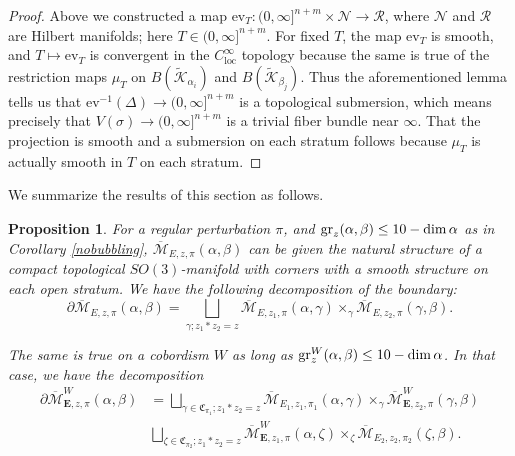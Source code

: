 \documentclass{memo-l}
\newtheorem{proposition}[theorem]{Proposition}
\theoremstyle{definition}
\theoremstyle{remark}
\numberwithin{section}{chapter}
\numberwithin{equation}{chapter}
\begin{document}
\begin{proof}Above we constructed a map $\text{ev}_T:  (0,\infty]^{n+m} \times \mathcal N \to \mathcal R$, where $\mathcal N$ and $\mathcal R$ are Hilbert manifolds; here $T \in (0,\infty]^{n+m}$. For fixed $T$, the map $\text{ev}_T$ is smooth, and $T \mapsto \text{ev}_T$ is convergent in the $C^\infty_\text{loc}$ topology because the same is true of the restriction maps $\mu_T$ on $B(\widetilde{\mathcal K}_{\alpha_i})$ and $B(\widetilde{\mathcal K}_{\beta_j})$. Thus the aforementioned lemma tells us that $\text{ev}^{-1}(\Delta) \to (0,\infty]^{n+m}$ is a topological submersion, which means precisely that $V(\sigma) \to (0,\infty]^{n+m}$ is a trivial fiber bundle near $\infty$. That the projection is smooth and a submersion on each stratum follows because $\mu_T$ is actually smooth in $T$ on each stratum.
\end{proof}

We summarize the results of this section as follows.

\begin{proposition}\label{gluing}For a regular perturbation $\pi$, and $\textup{gr}_z(\alpha, \beta) \leq 10 - \dim \alpha$ as in Corollary \ref{nobubbling}, $\overline{\mathcal M}_{E,z,\pi}(\alpha,\beta)$ can be given the natural structure of a compact topological $SO(3)$-manifold with corners with a smooth structure on each open stratum. We have the following decomposition of the boundary: $$\partial \overline{\mathcal M}_{E,z,\pi}(\alpha, \beta) = \bigsqcup_{\gamma; z_1 \ast z_2 = z} \overline{\mathcal M}_{E,z_1,\pi}(\alpha, \gamma) \times_\gamma \overline{\mathcal M}_{E,z_2,\pi}(\gamma, \beta).$$

The same is true on a cobordism $W$ as long as $\textup{gr}^W_z(\alpha, \beta) \leq 10 - \dim \alpha$. In that case, we have the decomposition
\begin{align*}\partial \overline{\mathcal M}^W_{\mathbf E,z,\pi}(\alpha, \beta) &= \bigsqcup_{\gamma \in \mathfrak C_{\pi_1}; z_1 \ast z_2 = z} \overline{\mathcal M}_{E_1,z_1,\pi_1}(\alpha, \gamma) \times_\gamma \overline{\mathcal M}^W_{\mathbf{E},z_2,\pi}(\gamma, \beta)\\
&\bigsqcup_{\zeta \in \mathfrak C_{\pi_2}; z_1 \ast z_2 = z} \overline{\mathcal M}^W_{\mathbf{E},z_1,\pi} (\alpha, \zeta) \times_\zeta \overline{\mathcal M}_{E_2,z_2,\pi_2}(\zeta, \beta).
\end{align*}
\end{proposition}
\end{document}
